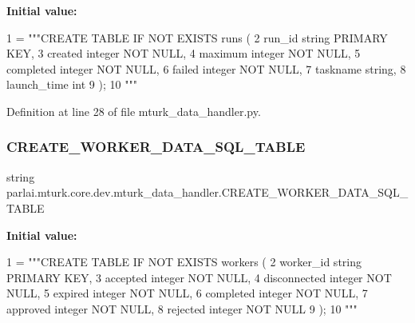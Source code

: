 {\bfseries Initial value\+:}
\begin{DoxyCode}
1 =  \textcolor{stringliteral}{"""CREATE TABLE IF NOT EXISTS runs (}
2 \textcolor{stringliteral}{        run\_id string PRIMARY KEY,}
3 \textcolor{stringliteral}{        created integer NOT NULL,}
4 \textcolor{stringliteral}{        maximum integer NOT NULL,}
5 \textcolor{stringliteral}{        completed integer NOT NULL,}
6 \textcolor{stringliteral}{        failed integer NOT NULL,}
7 \textcolor{stringliteral}{        taskname string,}
8 \textcolor{stringliteral}{        launch\_time int}
9 \textcolor{stringliteral}{    );}
10 \textcolor{stringliteral}{    """}
\end{DoxyCode}


Definition at line 28 of file mturk\+\_\+data\+\_\+handler.\+py.

\mbox{\label{namespaceparlai_1_1mturk_1_1core_1_1dev_1_1mturk__data__handler_a00d6b9648875a287e673c3c39f19ba76}} 
\subsubsection{\texorpdfstring{C\+R\+E\+A\+T\+E\+\_\+\+W\+O\+R\+K\+E\+R\+\_\+\+D\+A\+T\+A\+\_\+\+S\+Q\+L\+\_\+\+T\+A\+B\+LE}{CREATE\_WORKER\_DATA\_SQL\_TABLE}}
{\footnotesize\ttfamily string parlai.\+mturk.\+core.\+dev.\+mturk\+\_\+data\+\_\+handler.\+C\+R\+E\+A\+T\+E\+\_\+\+W\+O\+R\+K\+E\+R\+\_\+\+D\+A\+T\+A\+\_\+\+S\+Q\+L\+\_\+\+T\+A\+B\+LE}

{\bfseries Initial value\+:}
\begin{DoxyCode}
1 =  \textcolor{stringliteral}{"""CREATE TABLE IF NOT EXISTS workers (}
2 \textcolor{stringliteral}{        worker\_id string PRIMARY KEY,}
3 \textcolor{stringliteral}{        accepted integer NOT NULL,}
4 \textcolor{stringliteral}{        disconnected integer NOT NULL,}
5 \textcolor{stringliteral}{        expired integer NOT NULL,}
6 \textcolor{stringliteral}{        completed integer NOT NULL,}
7 \textcolor{stringliteral}{        approved integer NOT NULL,}
8 \textcolor{stringliteral}{        rejected integer NOT NULL}
9 \textcolor{stringliteral}{    );}
10 \textcolor{stringliteral}{    """}
\end{DoxyCode}


